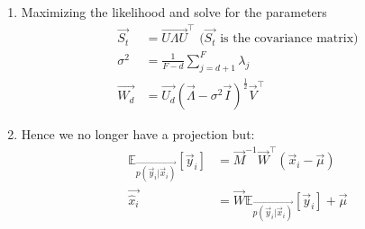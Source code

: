\documentclass[12pt,twoside]{article}
\begin{document}
\begin{enumerate}
\item  Maximizing the likelihood and solve for the parameters
\begin{align*}
\vec{S_t} & = \vec{U\Lambda U}^\top \text{ ($\vec{S_t}$ is the covariance matrix)}\\
\sigma^2 & = \frac{1}{F-d} \sum_{j= d+1}^F \lambda_j\\
\vec{W_d}&= \vec{U_d}(\vec{\Lambda} - \sigma^2\vec{I})^{\frac{1}{2}}\vec{V}^\top
\end{align*}

\item Hence we no longer have a projection but:
\begin{align*}
\mathbb{E}_{\vec{p(\vec{y}_i\vert \vec{x}_i)}} [\vec{y}_i] & = \vec{M}^{-1}\vec{W}^\top (\vec{x}_i - \vec{\mu})\\
\vec{\widehat{x}_i}&= \vec{W}\mathbb{E}_{\vec{p(\vec{y}_i\vert \vec{x}_i)}} [\vec{y}_i]  + \vec{\mu}
\end{align*}

\end{enumerate}
\end{document}

